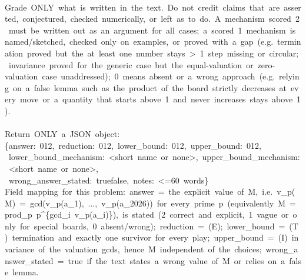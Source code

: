\begin{flushleft}
\mbox{}\\
{}Grade\ ONLY\ what\ is\ written\ in\ the\ text.\ Do\ not\ credit\ claims\ that\ are\ asserted,\ conjectured,\ checked\ numerically,\ or\ left\ as\ \textquotedbl{}to\ do\textquotedbl{}.\ A\ mechanism\ scored\ 2\ must\ be\ written\ out\ as\ an\ argument\ for\ all\ cases;\ a\ scored\ 1\ mechanism\ is\ named/sketched,\ checked\ only\ on\ examples,\ or\ proved\ with\ a\ gap\ (e.g.\ termination\ proved\ but\ the\ \textquotedbl{}at\ least\ one\ number\ stays\ \textgreater{}\ 1\textquotedbl{}\ step\ missing\ or\ circular;\ invariance\ proved\ for\ the\ generic\ case\ but\ the\ equal-{}valuation\ or\ zero-{}valuation\ case\ unaddressed);\ 0\ means\ absent\ or\ a\ wrong\ approach\ (e.g.\ relying\ on\ a\ false\ lemma\ such\ as\ \textquotedbl{}the\ product\ of\ the\ board\ strictly\ decreases\ at\ every\ move\textquotedbl{}\ or\ \textquotedbl{}a\ quantity\ that\ starts\ above\ 1\ and\ never\ increases\ stays\ above\ 1\textquotedbl{}).\\
\mbox{}\\
{}Return\ ONLY\ a\ JSON\ object:\\
{}\{\textquotedbl{}answer\textquotedbl{}:\ 0\textbar{}1\textbar{}2,\ \textquotedbl{}reduction\textquotedbl{}:\ 0\textbar{}1\textbar{}2,\ \textquotedbl{}lower\_bound\textquotedbl{}:\ 0\textbar{}1\textbar{}2,\ \textquotedbl{}upper\_bound\textquotedbl{}:\ 0\textbar{}1\textbar{}2,\\
{}\ \textquotedbl{}lower\_bound\_mechanism\textquotedbl{}:\ \textquotedbl{}\textless{}short\ name\ or\ \textquotesingle{}none\textquotesingle{}\textgreater{}\textquotedbl{},\ \textquotedbl{}upper\_bound\_mechanism\textquotedbl{}:\ \textquotedbl{}\textless{}short\ name\ or\ \textquotesingle{}none\textquotesingle{}\textgreater{}\textquotedbl{},\\
{}\ \textquotedbl{}wrong\_answer\_stated\textquotedbl{}:\ true\textbar{}false,\ \textquotedbl{}notes\textquotedbl{}:\ \textquotedbl{}\textless{}=60\ words\textquotedbl{}\}\\
{}Field\ mapping\ for\ this\ problem:\ \textquotedbl{}answer\textquotedbl{}\ =\ the\ explicit\ value\ of\ M,\ i.e.\ v\_p(M)\ =\ gcd(v\_p(a\_1),\ ...,\ v\_p(a\_2026))\ for\ every\ prime\ p\ (equivalently\ M\ =\ prod\_p\ p\^{}\{gcd\_i\ v\_p(a\_i)\}),\ is\ stated\ (2\ correct\ and\ explicit,\ 1\ vague\ or\ only\ for\ special\ boards,\ 0\ absent/wrong);\ \textquotedbl{}reduction\textquotedbl{}\ =\ (E);\ \textquotedbl{}lower\_bound\textquotedbl{}\ =\ (T)\ termination\ and\ exactly\ one\ survivor\ for\ every\ play;\ \textquotedbl{}upper\_bound\textquotedbl{}\ =\ (I)\ invariance\ of\ the\ valuation\ gcds,\ hence\ M\ independent\ of\ the\ choices;\ \textquotedbl{}wrong\_answer\_stated\textquotedbl{}\ =\ true\ if\ the\ text\ states\ a\ wrong\ value\ of\ M\ or\ relies\ on\ a\ false\ lemma.\\
\end{flushleft}
